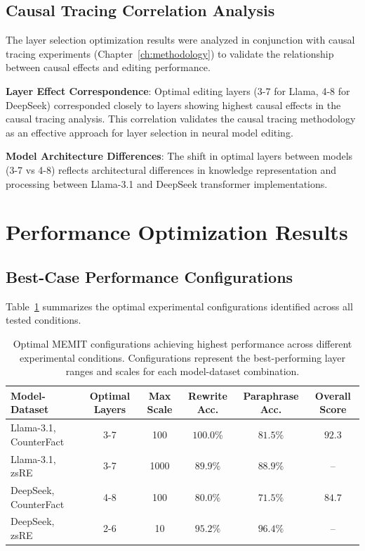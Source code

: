 \subsection{Causal Tracing Correlation Analysis}
\label{subsec:causal_correlation}

The layer selection optimization results were analyzed in conjunction with causal tracing experiments (Chapter~\ref{ch:methodology}) to validate the relationship between causal effects and editing performance.

\textbf{Layer Effect Correspondence}: Optimal editing layers (3-7 for Llama, 4-8 for DeepSeek) corresponded closely to layers showing highest causal effects in the causal tracing analysis. This correlation validates the causal tracing methodology as an effective approach for layer selection in neural model editing.

\textbf{Model Architecture Differences}: The shift in optimal layers between models (3-7 vs 4-8) reflects architectural differences in knowledge representation and processing between Llama-3.1 and DeepSeek transformer implementations.


\section{Performance Optimization Results}
\label{sec:optimization_results}

\subsection{Best-Case Performance Configurations}
\label{subsec:best_case_performance}

Table~\ref{tab:optimal_configurations} summarizes the optimal experimental configurations identified across all tested conditions.

\begin{table}[H]
\centering
\caption[Optimal MEMIT Configurations]{Optimal MEMIT configurations achieving highest performance across different experimental conditions. Configurations represent the best-performing layer ranges and scales for each model-dataset combination.}
\label{tab:optimal_configurations}
\begin{tabular}{lccccc}
\toprule
\textbf{Model-Dataset} & \textbf{Optimal Layers} & \textbf{Max Scale} & \textbf{Rewrite Acc.} & \textbf{Paraphrase Acc.} & \textbf{Overall Score} \\
\midrule
Llama-3.1, CounterFact & 3-7 & 100 & $100.0\%$ & $81.5\%$ & $92.3$ \\
Llama-3.1, zsRE & 3-7 & 1000 & $89.9\%$ & $88.9\%$ & -- \\
DeepSeek, CounterFact & 4-8 & 100 & $80.0\%$ & $71.5\%$ & $84.7$ \\
DeepSeek, zsRE & 2-6 & 10 & $95.2\%$ & $96.4\%$ & -- \\
\bottomrule
\end{tabular}
\end{table}

